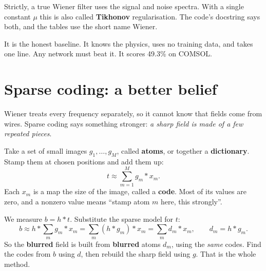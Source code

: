 Strictly, a true Wiener filter uses the signal and noise spectra. With a single constant $\mu$
this is also called \textbf{Tikhonov} regularisation. The code's docstring says both, and the
tables use the short name Wiener.

\begin{keyidea}
It is the honest baseline. It knows the physics, uses no training data, and takes one line. Any network
must beat it. It scores 49.3\% on COMSOL.
\end{keyidea}

\section{Sparse coding: a better belief}

Wiener treats every frequency separately, so it cannot know that fields come from wires. Sparse
coding says something stronger: \emph{a sharp field is made of a few repeated pieces}.

Take a set of small images $g_1,\dots,g_M$, called \textbf{atoms}, or together a
\textbf{dictionary}. Stamp them at chosen positions and add them up:
\begin{equation}
t \approx \sum_{m=1}^{M} g_m * x_m .
\end{equation}
Each $x_m$ is a map the size of the image, called a \textbf{code}. Most of its values are zero, and a
nonzero value means ``stamp atom $m$ here, this strongly''.

\begin{keyidea}
We measure $b = h*t$. Substitute the sparse model for $t$:
\begin{equation}
b \approx h * \sum_m g_m * x_m = \sum_m (h * g_m) * x_m = \sum_m d_m * x_m,
\qquad d_m = h*g_m .
\end{equation}
So the \textbf{blurred} field is built from \textbf{blurred} atoms $d_m$, using the \emph{same} codes. Find
the codes from $b$ using $d$, then rebuild the sharp field using $g$. That is the whole method.
\end{keyidea}

\begin{center}
\end{center}

